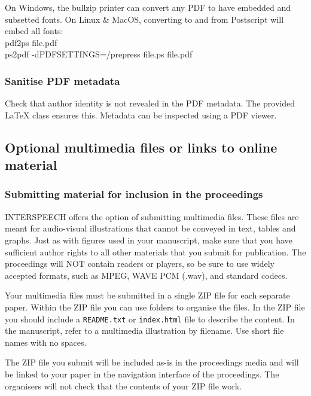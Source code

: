 \documentclass{INTERSPEECH2023}
\begin{document}
On Windows, the bullzip printer can convert any PDF to have embedded and subsetted fonts. On Linux \& MacOS, converting to and from Postscript will embed all fonts:
\\

\noindent\textsf{pdf2ps file.pdf}\\
\noindent\textsf{ps2pdf -dPDFSETTINGS=/prepress file.ps file.pdf}


\subsubsection{Sanitise PDF metadata}
\label{section:pdf_sanitise}

Check that author identity is not revealed in the PDF metadata. The provided \LaTeX\xspace class ensures this. Metadata can be inspected using a PDF viewer. 

\subsection{Optional multimedia files or links to online material}
\label{section:multimedia}

\subsubsection{Submitting material for inclusion in the proceedings}

INTERSPEECH offers the option of submitting multimedia files. These files are meant for audio-visual illustrations that cannot be conveyed in text, tables and graphs. Just as with figures used in your manuscript, make sure that you have sufficient author rights to all other materials that you submit for publication. The proceedings will NOT contain readers or players, so be sure to use widely accepted formats, such as MPEG, WAVE PCM (.wav), and standard codecs.

Your multimedia files must be submitted in a single ZIP file for each separate paper. Within the ZIP file you can use folders to organise the files. In the ZIP file you should include a \texttt{README.txt} or \texttt{index.html} file to describe the content. In the manuscript, refer to a multimedia illustration by filename. Use short file names with no spaces.

The ZIP file you submit will be included as-is in the proceedings media and will be linked to your paper in the navigation interface of the proceedings. The organisers will not check that the contents of your ZIP file work.
\end{document}
